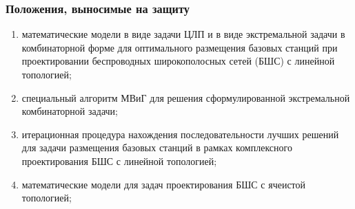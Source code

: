 \begin{frame}
    \setcounter{framenumber}{1}
    \maketitle
\end{frame}

\begin{frame}
    \frametitle{Положения, выносимые на защиту}
    \begin{enumerate} %
        \item математические модели в виде задачи ЦЛП и в виде экстремальной задачи в комбинаторной форме для оптимального размещения базовых станций при
        проектировании беспроводных широкополосных сетей (БШС) с линейной топологией;
        \item специальный алгоритм МВиГ для решения сформулированной экстремальной комбинаторной задачи;
        \item итерационная процедура нахождения последовательности лучших решений для задачи размещения базовых станций в рамках комплексного
        проектирования БШС с линейной топологией;
        \item математические модели для задач  проектирования БШС с ячеистой
        топологией;
      \end{enumerate}
\end{frame}





